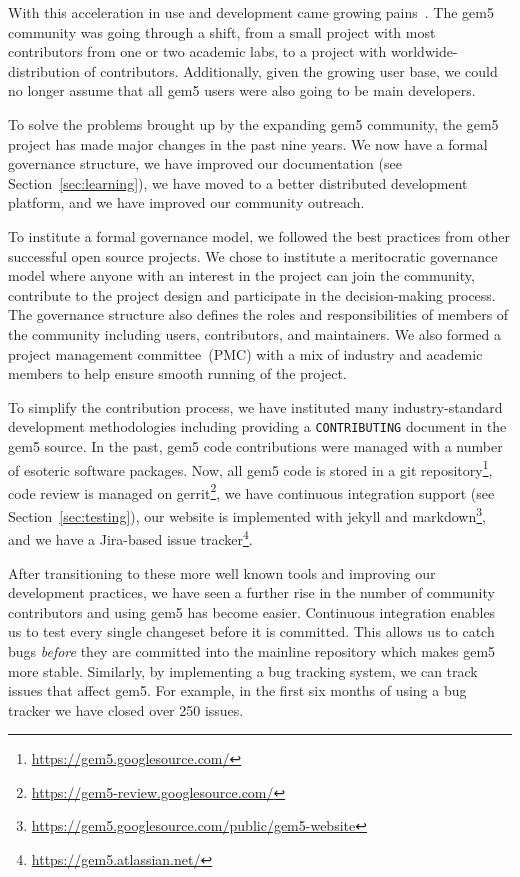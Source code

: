 With this acceleration in use and development came growing pains~\cite{Power-gem5horrors-2015}.
The gem5 community was going through a shift, from a small project with most contributors from one or two academic labs, to a project with worldwide-distribution of contributors.
Additionally, given the growing user base, we could no longer assume that all gem5 users were also going to be main developers.

To solve the problems brought up by the expanding gem5 community, the gem5 project has made major changes in the past nine years.
We now have a formal governance structure, we have improved our documentation (see Section~\ref{sec:learning}), we have moved to a better distributed development platform, and we have improved our community outreach.

To institute a formal governance model, we followed the best practices from other successful open source projects.
We chose to institute a meritocratic governance model where anyone with an interest in the project can join the community, contribute to the project design and participate in the decision-making process.
The governance structure also defines the roles and responsibilities of members of the community including users, contributors, and maintainers.
We also formed a project management committee~(PMC) with a mix of industry and academic members to help ensure smooth running of the project.

To simplify the contribution process, we have instituted many industry-standard development methodologies including providing a \verb|CONTRIBUTING| document in the gem5 source.
In the past, gem5 code contributions were managed with a number of esoteric software packages.
Now, all gem5 code is stored in a git repository\footnote{\url{https://gem5.googlesource.com/}}, code review is managed on gerrit\footnote{\url{https://gem5-review.googlesource.com/}}, we have continuous integration support (see Section~\ref{sec:testing}), our website is implemented with jekyll and markdown\footnote{\url{https://gem5.googlesource.com/public/gem5-website}}, and we have a Jira-based issue tracker\footnote{\url{https://gem5.atlassian.net/}}.

After transitioning to these more well known tools and improving our development practices, we have seen a further rise in the number of community contributors and using gem5 has become easier.
Continuous integration enables us to test every single changeset before it is committed.
This allows us to catch bugs \emph{before} they are committed into the mainline repository which makes gem5 more stable.
Similarly, by implementing a bug tracking system, we can track issues that affect gem5.
For example, in the first six months of using a bug tracker we have closed over 250 issues.

